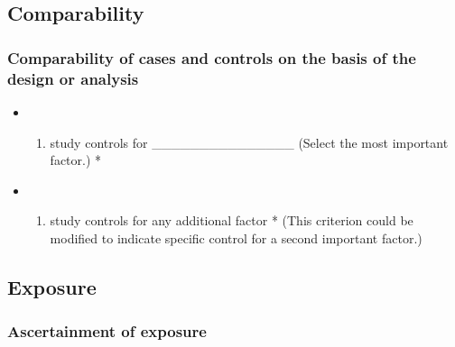\documentclass[
  doc, a4paper]{apa7}
\providecommand{\tightlist}{%
  \setlength{\itemsep}{0pt}\setlength{\parskip}{0pt}}
\begin{document}
\subsection{Comparability}\label{comparability}

\subsubsection{Comparability of cases and controls on the basis of the design or analysis}\label{comparability-of-cases-and-controls-on-the-basis-of-the-design-or-analysis}

\begin{itemize}
\tightlist
\item
  \begin{enumerate}
  \def\labelenumi{\alph{enumi})}
  \tightlist
  \item
    study controls for \_\_\_\_\_\_\_\_\_\_\_\_\_\_\_ (Select the most important factor.) *
  \end{enumerate}
\item
  \begin{enumerate}
  \def\labelenumi{\alph{enumi})}
  \setcounter{enumi}{1}
  \tightlist
  \item
    study controls for any additional factor * (This criterion could be modified to indicate specific control for a second important factor.)
  \end{enumerate}
\end{itemize}

\subsection{Exposure}\label{exposure}

\subsubsection{Ascertainment of exposure}\label{ascertainment-of-exposure}
\end{document}
